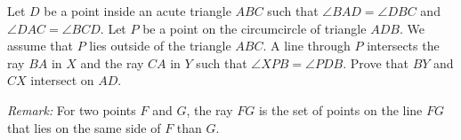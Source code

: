 Let $D$ be a point inside an acute triangle $ABC$ such that $\angle BAD= \angle DBC$ and $\angle DAC=\angle BCD$.
Let $P$ be a point on the circumcircle of triangle $ADB$.
We assume that $P$ lies outside of the triangle $ABC$.
A line through $P$ intersects the ray $BA$ in $X$ and the ray $CA$ in $Y$ such that $\angle XPB=\angle PDB$.
Prove that $BY$ and $CX$ intersect on $AD$.

\emph{Remark:} For two points $F$ and $G$,
the ray $FG$ is the set of points on the line $FG$ that lies on the same side of $F$ than $G$.
